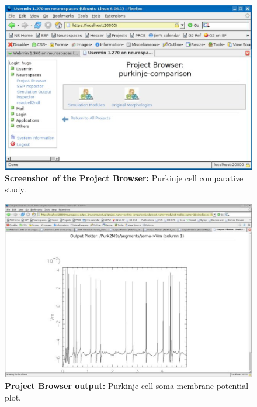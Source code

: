 \documentclass[12pt]{article}
\begin{document}
\begin{figure}[h]
  \centering
 \includegraphics[scale=0.6]{figures/screenshot-3.eps}
 \caption{{\bf Screenshot of the Project Browser:} Purkinje cell comparative study.}
  \label{fig:pb-3}
\end{figure}

\begin{figure}[h]
  \centering
 \includegraphics[scale=0.6]{figures/screenshot-4.eps}
 \caption{{\bf Project Browser output:} Purkinje cell soma membrane potential plot.}
  \label{fig:pb-4}
\end{figure}
\end{document}

